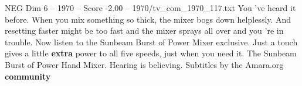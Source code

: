 \begin{textsample}{NEG Dim 6 – 1970 – Score -2.00 – 1970/tv\_com\_1970\_117.txt}  \label{ex:f6_neg_064}
You 've heard it before.
When you mix something so thick, the mixer bogs down helplessly.
And resetting faster might be too fast and the mixer sprays all over and you 're in trouble.
Now listen to the Sunbeam Burst of Power Mixer exclusive.
Just a touch gives a little \textbf{extra} power to all five speeds, just when you need it.
The Sunbeam Burst of Power Hand Mixer.
Hearing is believing.
Subtitles by the Amara.org \textbf{community}

\end{textsample}

